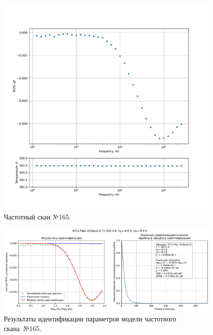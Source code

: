 \begin{figure}[!ht]
    \centering
    \includegraphics[width=1\textwidth]{../plots/КТ117№1_п1(база 2)_2500Гц-1Гц_1пФ_+30С_-6В-9В_100мВ_20мкс_шаг_0,1.pdf}
    \caption{Частотный скан №165.}
    \label{pic:frequency_scan_165}
\end{figure}

\begin{figure}[!ht]
    \centering
    \includegraphics[width=1\textwidth]{../plots/КТ117№1_п1(база 2)_2500Гц-1Гц_1пФ_+30С_-6В-9В_100мВ_20мкс_шаг_0,1_model.pdf}
    \caption{Результаты идентификации параметров модели частотного скана~№165.}
    \label{pic:frequency_scan_model165}
\end{figure}

\pagebreak


